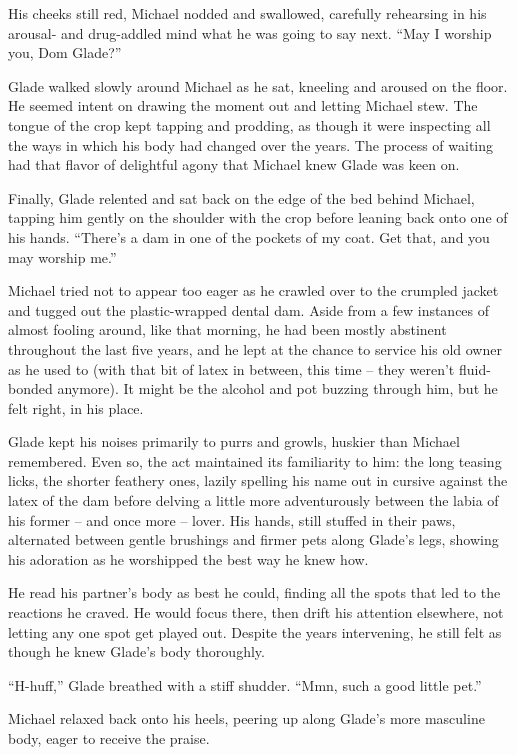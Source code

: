 His cheeks still red, Michael nodded and swallowed, carefully rehearsing in his arousal- and drug-addled mind what he was going to say next.  ``May I worship you, Dom Glade?''

Glade walked slowly around Michael as he sat, kneeling and aroused on the floor.  He seemed intent on drawing the moment out and letting Michael stew.  The tongue of the crop kept tapping and prodding, as though it were inspecting all the ways in which his body had changed over the years.  The process of waiting had that flavor of delightful agony that Michael knew Glade was keen on.

Finally, Glade relented and sat back on the edge of the bed behind Michael, tapping him gently on the shoulder with the crop before leaning back onto one of his hands.  ``There's a dam in one of the pockets of my coat.  Get that, and you may worship me.''

Michael tried not to appear too eager as he crawled over to the crumpled jacket and tugged out the plastic-wrapped dental dam.  Aside from a few instances of almost fooling around, like that morning, he had been mostly abstinent throughout the last five years, and he lept at the chance to service his old owner as he used to (with that bit of latex in between, this time -- they weren't fluid-bonded anymore).  It might be the alcohol and pot buzzing through him, but he felt right, in his place.

Glade kept his noises primarily to purrs and growls, huskier than Michael remembered.  Even so, the act maintained its familiarity to him: the long teasing licks, the shorter feathery ones, lazily spelling his name out in cursive against the latex of the dam before delving a little more adventurously between the labia of his former -- and once more -- lover.  His hands, still stuffed in their paws, alternated between gentle brushings and firmer pets along Glade's legs, showing his adoration as he worshipped the best way he knew how.

He read his partner's body as best he could, finding all the spots that led to the reactions he craved.  He would focus there, then drift his attention elsewhere, not letting any one spot get played out.  Despite the years intervening, he still felt as though he knew Glade's body thoroughly.

``H-huff,'' Glade breathed with a stiff shudder.  ``Mmn, such a good little pet.''

Michael relaxed back onto his heels, peering up along Glade's more masculine body, eager to receive the praise.

